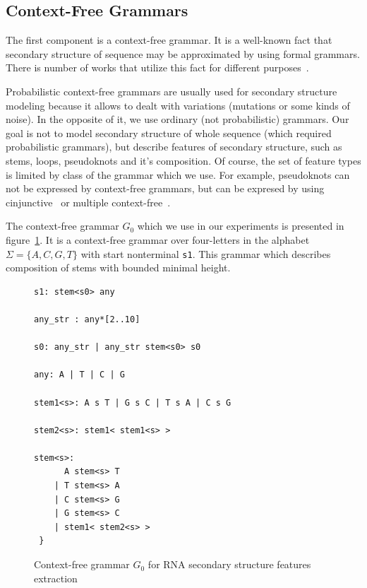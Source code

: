 \documentclass[a4paper,twoside]{article}
\begin{document}
\subsection{Context-Free Grammars}

\noindent The first component is a context-free grammar. 
It is a well-known fact that secondary structure of sequence may be approximated by using formal grammars.
There is number of works that utilize this fact for different purposes~\cite{GrammarsRNA,LWPCFG,zier2013rna,knudsen2003pfold}.

Probabilistic context-free grammars are usually used for secondary structure modeling because it allows to dealt with variations (mutations or some kinds of noise).
In the opposite of it, we use ordinary (not probabilistic) grammars.
Our goal is not to model secondary structure of whole sequence (which required probabilistic grammars), but describe features of secondary structure, such as stems, loops, pseudoknots and it's composition.
Of course, the set of feature types is limited by class of the grammar which we use.
For example, pseudoknots can not be expressed by context-free grammars, but can be expresed by using cinjunctive~\cite{KanchanDevi2017,zier2013rna,Okhotin:2001:CG:543313.543323} or multiple context-free~\cite{SEKI1991191,Riechert:2016:ADP:2972703.2972851}.

The context-free grammar $G_0$ which we use in our experiments is presented in figure~\ref{fig:cfg-rna}.
It is a context-free grammar over four-letters in the alphabet $\Sigma=\{A,C,G,T\}$ with start nonterminal \verb|s1|.
This grammar which describes composition of stems with bounded minimal height.

\begin{figure}
\begin{verbatim}
s1: stem<s0> any

any_str : any*[2..10]

s0: any_str | any_str stem<s0> s0

any: A | T | C | G

stem1<s>: A s T | G s C | T s A | C s G 

stem2<s>: stem1< stem1<s> >

stem<s>:  
      A stem<s> T 
    | T stem<s> A 
    | C stem<s> G 
    | G stem<s> C 
    | stem1< stem2<s> >  
 } 
\end{verbatim}
\caption{Context-free grammar $G_0$ for RNA secondary structure features extraction}
\label{fig:cfg-rna}
\end{figure}
\end{document}
